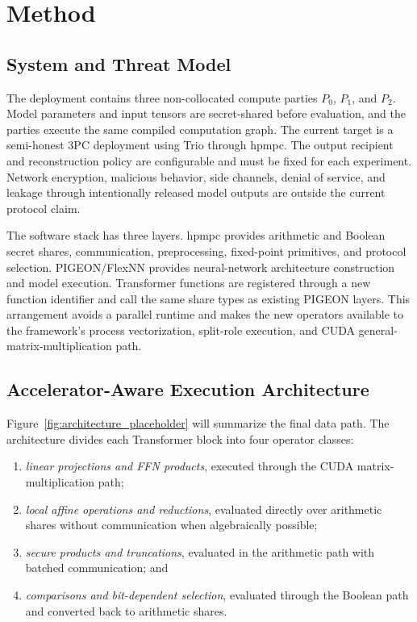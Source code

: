 \section{Method}
\label{sec:method}

\subsection{System and Threat Model}
The deployment contains three non-collocated compute parties $P_0$, $P_1$, and $P_2$. Model parameters and input tensors are secret-shared before evaluation, and the parties execute the same compiled computation graph. The current target is a semi-honest 3PC deployment using Trio through hpmpc. The output recipient and reconstruction policy are configurable and must be fixed for each experiment. Network encryption, malicious behavior, side channels, denial of service, and leakage through intentionally released model outputs are outside the current protocol claim.

The software stack has three layers. hpmpc provides arithmetic and Boolean secret shares, communication, preprocessing, fixed-point primitives, and protocol selection. PIGEON/FlexNN provides neural-network architecture construction and model execution. Transformer functions are registered through a new function identifier and call the same share types as existing PIGEON layers. This arrangement avoids a parallel runtime and makes the new operators available to the framework's process vectorization, split-role execution, and CUDA general-matrix-multiplication path.

\subsection{Accelerator-Aware Execution Architecture}
Figure~\ref{fig:architecture_placeholder} will summarize the final data path. The architecture divides each Transformer block into four operator classes:

\begin{enumerate}
    \item \emph{linear projections and FFN products}, executed through the CUDA matrix-multiplication path;
    \item \emph{local affine operations and reductions}, evaluated directly over arithmetic shares without communication when algebraically possible;
    \item \emph{secure products and truncations}, evaluated in the arithmetic path with batched communication; and
    \item \emph{comparisons and bit-dependent selection}, evaluated through the Boolean path and converted back to arithmetic shares.
\end{enumerate}

